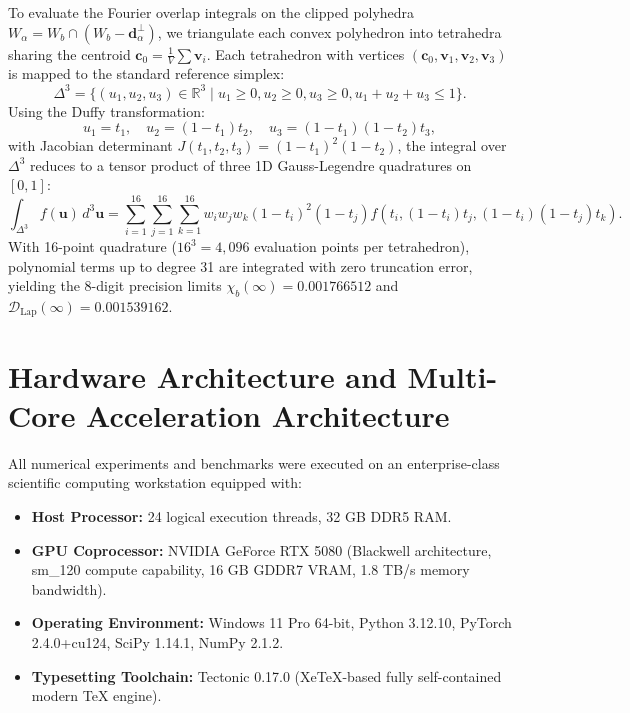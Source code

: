\documentclass[11pt,a4paper]{article}
\theoremstyle{definition}
\newcommand{\R}{\mathbb{R}}
\begin{document}
To evaluate the Fourier overlap integrals on the clipped polyhedra $W_\alpha = W_b \cap (W_b - \mathbf{d}_\alpha^\perp)$, we triangulate each convex polyhedron into tetrahedra sharing the centroid $\mathbf{c}_0 = \frac{1}{V}\sum \mathbf{v}_i$. 
Each tetrahedron with vertices $(\mathbf{c}_0, \mathbf{v}_1, \mathbf{v}_2, \mathbf{v}_3)$ is mapped to the standard reference simplex:
\begin{equation}
\Delta^3 = \{ (u_1, u_2, u_3) \in \R^3 \mid u_1 \ge 0, u_2 \ge 0, u_3 \ge 0, u_1 + u_2 + u_3 \le 1 \}.
\end{equation}
Using the Duffy transformation:
\begin{equation}
u_1 = t_1, \quad u_2 = (1-t_1)t_2, \quad u_3 = (1-t_1)(1-t_2)t_3,
\end{equation}
with Jacobian determinant $J(t_1, t_2, t_3) = (1-t_1)^2 (1-t_2)$, the integral over $\Delta^3$ reduces to a tensor product of three 1D Gauss-Legendre quadratures on $[0, 1]$:
\begin{equation}
\int_{\Delta^3} f(\mathbf{u}) \, d^3\mathbf{u} = \sum_{i=1}^{16} \sum_{j=1}^{16} \sum_{k=1}^{16} w_i w_j w_k (1-t_i)^2 (1-t_j) f(t_i, (1-t_i)t_j, (1-t_i)(1-t_j)t_k).
\end{equation}
With 16-point quadrature ($16^3 = 4,096$ evaluation points per tetrahedron), polynomial terms up to degree 31 are integrated with zero truncation error, yielding the 8-digit precision limits $\chi_b(\infty) = 0.001766512$ and $\mathcal{D}_{\mathrm{Lap}}(\infty) = 0.001539162$.

\section{Hardware Architecture and Multi-Core Acceleration Architecture}
\label{app:hardware}

All numerical experiments and benchmarks were executed on an enterprise-class scientific computing workstation equipped with:
\begin{itemize}
    \item \textbf{Host Processor:} 24 logical execution threads, 32 GB DDR5 RAM.
    \item \textbf{GPU Coprocessor:} NVIDIA GeForce RTX 5080 (Blackwell architecture, sm\_120 compute capability, 16 GB GDDR7 VRAM, 1.8 TB/s memory bandwidth).
    \item \textbf{Operating Environment:} Windows 11 Pro 64-bit, Python 3.12.10, PyTorch 2.4.0+cu124, SciPy 1.14.1, NumPy 2.1.2.
    \item \textbf{Typesetting Toolchain:} Tectonic 0.17.0 (XeTeX-based fully self-contained modern TeX engine).
\end{itemize}
\end{document}
